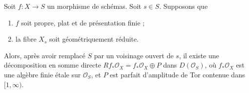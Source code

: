\begin{lemma}
\label{lemma-proper-flat-geom-red}
Soit $f : X \to S$ un morphisme de schémas. Soit $s \in S$. Supposons que
\begin{enumerate}
\item $f$ soit propre, plat et de présentation finie ;
\item la fibre $X_s$ soit géométriquement réduite.
\end{enumerate}
Alors, après avoir remplacé $S$ par un voisinage ouvert de $s$, il
existe une décomposition en somme directe
$Rf_*\mathcal{O}_X = f_*\mathcal{O}_X \oplus P$
dans $D(\mathcal{O}_S)$, où $f_*\mathcal{O}_X$ est une algèbre finie \'etale
sur $\mathcal{O}_S$, et
$P$ est parfait d'amplitude de Tor contenue dans $[1, \infty)$.
\end{lemma}

